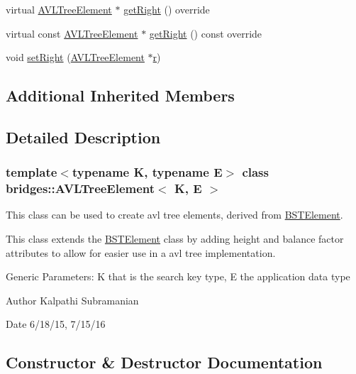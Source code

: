 \begin{DoxyCompactItemize}
\item 
virtual \mbox{\hyperlink{classbridges_1_1_a_v_l_tree_element}{A\+V\+L\+Tree\+Element}} $\ast$ \mbox{\hyperlink{classbridges_1_1_a_v_l_tree_element_a909b46ebf3e8c6a3434762a1f01499e2}{get\+Right}} () override
\item 
virtual const \mbox{\hyperlink{classbridges_1_1_a_v_l_tree_element}{A\+V\+L\+Tree\+Element}} $\ast$ \mbox{\hyperlink{classbridges_1_1_a_v_l_tree_element_a2f6fd127f3a04fcc5be60299b7d98f12}{get\+Right}} () const override
\item 
void \mbox{\hyperlink{classbridges_1_1_a_v_l_tree_element_a2e048abe8e79232effa92dfdbeac4a54}{set\+Right}} (\mbox{\hyperlink{classbridges_1_1_a_v_l_tree_element}{A\+V\+L\+Tree\+Element}} $\ast$\mbox{\hyperlink{namespacebridges_acfb0a4f7877d8f63de3e6862004c50eda4b43b0aee35624cd95b910189b3dc231}{r}})
\end{DoxyCompactItemize}
\subsection*{Additional Inherited Members}


\subsection{Detailed Description}
\subsubsection*{template$<$typename K, typename E$>$\newline
class bridges\+::\+A\+V\+L\+Tree\+Element$<$ K, E $>$}

This class can be used to create avl tree elements, derived from \mbox{\hyperlink{classbridges_1_1_b_s_t_element}{B\+S\+T\+Element}}. 

This class extends the \mbox{\hyperlink{classbridges_1_1_b_s_t_element}{B\+S\+T\+Element}} class by adding height and balance factor attributes to allow for easier use in a avl tree implementation.

Generic Parameters\+: K that is the search key type, E the application data type

\begin{DoxyAuthor}{Author}
Kalpathi Subramanian 
\end{DoxyAuthor}
\begin{DoxyDate}{Date}
6/18/15, 7/15/16 
\end{DoxyDate}


\subsection{Constructor \& Destructor Documentation}
\mbox{\label{classbridges_1_1_a_v_l_tree_element_a24d1dfb65f00f2fef96a57a3f869a263}} 
